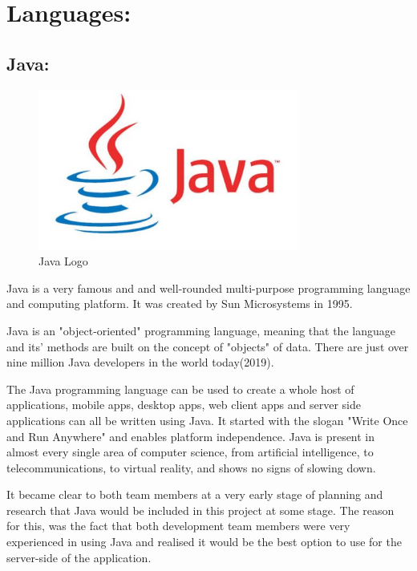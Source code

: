  

\section{Languages:}
\label{sec:TechnologyReviewLanguages}
\subsection{Java:}
\label{sec:TechnologyReviewJava}

\begin{figure}[H]
    \centering
    \includegraphics[width=\textwidth, height=150pt]{img/JavaLogo.PNG}
    \caption{Java Logo}
    \label{fig:my_label}
\end{figure}

Java is a very famous and and well-rounded multi-purpose programming language and computing platform. It was created by Sun Microsystems in 1995. 

Java is an "object-oriented" programming language, meaning that the language and its' methods are built on the concept of "objects" of data. There are just over nine million Java developers in the world today(2019). 

\bigskip

The Java programming language can be used to create a whole host of applications, mobile apps, desktop apps, web client apps and server side applications can all be written using Java. It started with the slogan "Write Once and Run Anywhere" and enables platform independence. Java is present in almost every single area of computer science, from artificial intelligence, to telecommunications, to virtual reality, and shows no signs of slowing down. 

\bigskip

It became clear to both team members at a very early stage of planning and research that Java would be included in this project at some stage. The reason for this, was the fact that both development team members were very experienced in using Java and realised it would be the best option to use for the server-side of the application. 


